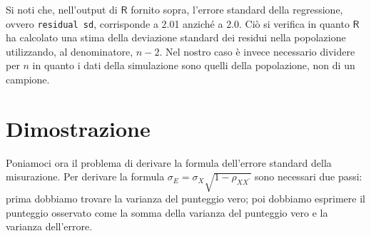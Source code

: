 \documentclass[
  11pt,
]{krantz}
\theoremstyle{definition}
\theoremstyle{definition}
\theoremstyle{definition}
\theoremstyle{definition}
\theoremstyle{remark}
\begin{document}
Si noti che, nell'output di \(\textsf{R}\) fornito sopra, l'errore standard della regressione, ovvero \texttt{residual\ sd}, corrisponde a 2.01 anziché a 2.0. Ciò si verifica in quanto \(\textsf{R}\) ha calcolato una stima della deviazione standard dei residui nella popolazione utilizzando, al denominatore, \(n - 2\). Nel nostro caso è invece necessario dividere per \(n\) in quanto i dati della simulazione sono quelli della popolazione, non di un campione.

\hypertarget{dimostrazione}{%
\section{Dimostrazione}\label{dimostrazione}}

Poniamoci ora il problema di derivare la formula dell'errore standard della misurazione. Per derivare la formula \(\sigma_E = \sigma_X \sqrt{1 -\rho_{XX^\prime}}\) sono necessari due passi: prima dobbiamo trovare la varianza del punteggio vero; poi dobbiamo esprimere il punteggio osservato come la somma della varianza del punteggio vero e la varianza dell'errore.
\end{document}
